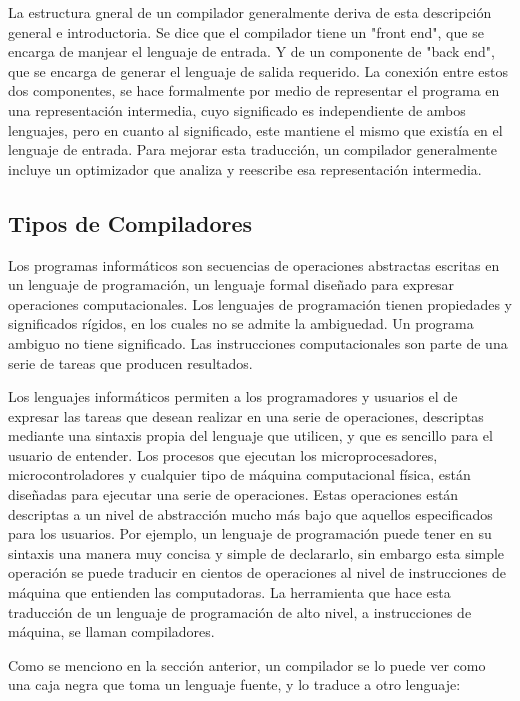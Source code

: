 \documentclass[fleqn]{tcdl}
\begin{document}
La estructura gneral de un compilador generalmente deriva de esta descripción general e introductoria. Se dice que el compilador tiene un "front end", que se encarga de manjear el lenguaje de entrada. Y de un componente de "back end", que se encarga de generar el lenguaje de salida requerido. La conexión entre estos dos componentes, se hace formalmente por medio de representar el programa en una representación intermedia, cuyo significado es independiente de ambos lenguajes, pero en cuanto al significado, este mantiene el mismo que existía en el lenguaje de entrada. Para mejorar esta traducción, un compilador generalmente incluye un optimizador que analiza y reescribe esa representación intermedia.


\subsection*{Tipos de Compiladores}

Los programas informáticos son secuencias de operaciones abstractas escritas en un lenguaje de programación, un lenguaje formal diseñado para expresar operaciones computacionales. Los lenguajes de programación tienen propiedades y significados rígidos, en los cuales no se admite la ambiguedad. Un programa ambiguo no tiene significado. Las instrucciones computacionales son parte de una serie de tareas que producen resultados. 

Los lenguajes informáticos permiten a los programadores y usuarios el de expresar las tareas que desean realizar en una serie de operaciones, descriptas mediante una sintaxis propia del lenguaje que utilicen, y que es sencillo para el usuario de entender. Los procesos que ejecutan los microprocesadores, microcontroladores y cualquier tipo de máquina computacional física, están diseñadas para ejecutar una serie de operaciones. Estas operaciones están descriptas a un nivel de abstracción mucho más bajo que aquellos especificados para los usuarios. Por ejemplo, un lenguaje de programación puede tener en su sintaxis una manera muy concisa y simple de declararlo, sin embargo esta simple operación se puede traducir en cientos de operaciones al nivel de instrucciones de máquina que entienden las computadoras. La herramienta que hace esta traducción de un lenguaje de programación de alto nivel, a instrucciones de máquina, se llaman compiladores. 

Como se menciono en la sección anterior, un compilador se lo puede ver como una caja negra que toma un lenguaje fuente, y lo traduce a otro lenguaje:
\end{document}

